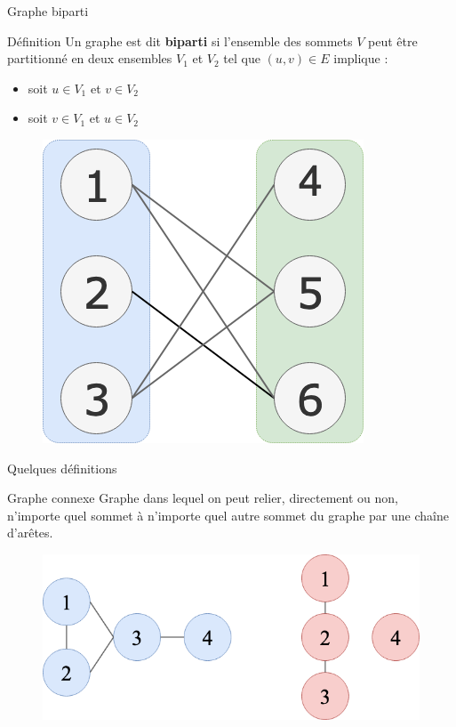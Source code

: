 \documentclass[10pt,xcolor=dvipsnames]{beamer}
\newcommand{\defin}[1]{\textcolor{darkspringgreen}{#1}}
\begin{document}
\begin{frame}{Graphe biparti}
    \begin{exampleblock}{Définition}
    Un graphe est dit \defin{\textbf{biparti}} si l'ensemble des sommets $V$ peut être partitionné en deux ensembles $V_1$ et $V_2$ tel que $(u,v) \in E$ implique :
    \begin{itemize}
        \item soit $u \in V_1$ et $v \in V_2$
        \item soit $v \in V_1$ et $u \in V_2$
    \end{itemize}
    \end{exampleblock}

    \begin{figure}
        \centering
        \includegraphics[scale=0.4]{figures/CM3/graph-bipartite.png}
        \label{fig:my_label}
    \end{figure}
\end{frame}

\begin{frame}{Quelques définitions}
    \begin{exampleblock}{Graphe connexe}
    Graphe dans lequel on peut relier, directement ou non, n'importe quel sommet à n'importe quel autre sommet du graphe par une chaîne d'arêtes.
\end{exampleblock}

\begin{figure}
    \centering
    \includegraphics[scale=0.4]{figures/CM3/graph-connected.png}
    \label{fig:my_label}
\end{figure}
\end{frame}
\end{document}

